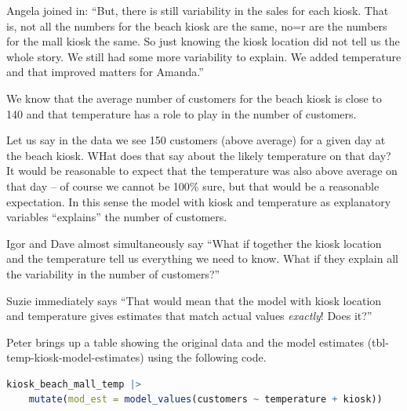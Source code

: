 \documentclass[
  12pt,
  letterpaper,
  DIV=11,
  numbers=noendperiod]{scrreprt}
\begin{document}
Angela joined in: ``But, there is still variability in the sales for
each kiosk. That is, not all the numbers for the beach kiosk are the
same, no=r are the numbers for the mall kiosk the same. So just knowing
the kiosk location did not tell us the whole story. We still had some
more variability to explain. We added temperature and that improved
matters for Amanda.''

\begin{tcolorbox}[enhanced jigsaw, colback=white, leftrule=.75mm, toprule=.15mm, bottomtitle=1mm, breakable, coltitle=black, toptitle=1mm, title=\textcolor{quarto-callout-important-color}{\faExclamation}\hspace{0.5em}{Important}, opacitybacktitle=0.6, colbacktitle=quarto-callout-important-color!10!white, arc=.35mm, left=2mm, colframe=quarto-callout-important-color-frame, titlerule=0mm, rightrule=.15mm, bottomrule=.15mm, opacityback=0]

We know that the average number of customers for the beach kiosk is
close to 140 and that temperature has a role to play in the number of
customers.

Let us say in the data we see 150 customers (above average) for a given
day at the beach kiosk. WHat does that say about the likely temperature
on that day? It would be reasonable to expect that the temperature was
also above average on that day -- of course we cannot be 100\% sure, but
that would be a reasonable expectation. In this sense the model with
kiosk and temperature as explanatory variables ``explains'' the number
of customers.

\end{tcolorbox}

Igor and Dave almost simultaneously say ``What if together the kiosk
location and the temperature tell us everything we need to know. What if
they explain all the variability in the number of customers?''

Suzie immediately says ``That would mean that the model with kiosk
location and temperature gives estimates that match actual values
\emph{exactly}! Does it?''

Peter brings up a table showing the original data and the model
estimates (tbl-temp-kiosk-model-estimates) using the following code.

\begin{lstlisting}[language=R]
  kiosk_beach_mall_temp |> 
    mutate(mod_est = model_values(customers ~ temperature + kiosk))
\end{lstlisting}
\end{document}
